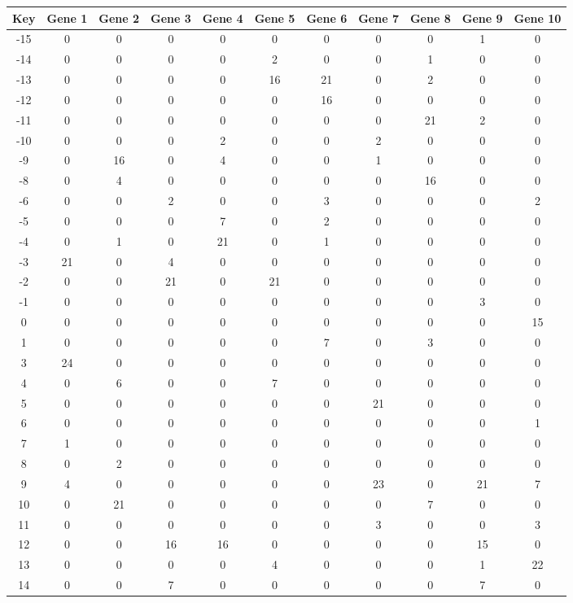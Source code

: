 \begin{tabular}{|c|c|c|c|c|c|c|c|c|c|c|}
\hline
Key & Gene 1 & Gene 2 & Gene 3 & Gene 4 & Gene 5 & Gene 6 & Gene 7 & Gene 8 & Gene 9 & Gene 10 \\
\hline
-15 & 0 & 0 & 0 & 0 & 0 & 0 & 0 & 0 & 1 & 0 \\
-14 & 0 & 0 & 0 & 0 & 2 & 0 & 0 & 1 & 0 & 0 \\
-13 & 0 & 0 & 0 & 0 & 16 & 21 & 0 & 2 & 0 & 0 \\
-12 & 0 & 0 & 0 & 0 & 0 & 16 & 0 & 0 & 0 & 0 \\
-11 & 0 & 0 & 0 & 0 & 0 & 0 & 0 & 21 & 2 & 0 \\
-10 & 0 & 0 & 0 & 2 & 0 & 0 & 2 & 0 & 0 & 0 \\
-9 & 0 & 16 & 0 & 4 & 0 & 0 & 1 & 0 & 0 & 0 \\
-8 & 0 & 4 & 0 & 0 & 0 & 0 & 0 & 16 & 0 & 0 \\
-6 & 0 & 0 & 2 & 0 & 0 & 3 & 0 & 0 & 0 & 2 \\
-5 & 0 & 0 & 0 & 7 & 0 & 2 & 0 & 0 & 0 & 0 \\
-4 & 0 & 1 & 0 & 21 & 0 & 1 & 0 & 0 & 0 & 0 \\
-3 & 21 & 0 & 4 & 0 & 0 & 0 & 0 & 0 & 0 & 0 \\
-2 & 0 & 0 & 21 & 0 & 21 & 0 & 0 & 0 & 0 & 0 \\
-1 & 0 & 0 & 0 & 0 & 0 & 0 & 0 & 0 & 3 & 0 \\
0 & 0 & 0 & 0 & 0 & 0 & 0 & 0 & 0 & 0 & 15 \\
1 & 0 & 0 & 0 & 0 & 0 & 7 & 0 & 3 & 0 & 0 \\
3 & 24 & 0 & 0 & 0 & 0 & 0 & 0 & 0 & 0 & 0 \\
4 & 0 & 6 & 0 & 0 & 7 & 0 & 0 & 0 & 0 & 0 \\
5 & 0 & 0 & 0 & 0 & 0 & 0 & 21 & 0 & 0 & 0 \\
6 & 0 & 0 & 0 & 0 & 0 & 0 & 0 & 0 & 0 & 1 \\
7 & 1 & 0 & 0 & 0 & 0 & 0 & 0 & 0 & 0 & 0 \\
8 & 0 & 2 & 0 & 0 & 0 & 0 & 0 & 0 & 0 & 0 \\
9 & 4 & 0 & 0 & 0 & 0 & 0 & 23 & 0 & 21 & 7 \\
10 & 0 & 21 & 0 & 0 & 0 & 0 & 0 & 7 & 0 & 0 \\
11 & 0 & 0 & 0 & 0 & 0 & 0 & 3 & 0 & 0 & 3 \\
12 & 0 & 0 & 16 & 16 & 0 & 0 & 0 & 0 & 15 & 0 \\
13 & 0 & 0 & 0 & 0 & 4 & 0 & 0 & 0 & 1 & 22 \\
14 & 0 & 0 & 7 & 0 & 0 & 0 & 0 & 0 & 7 & 0 \\
\hline
\end{tabular}